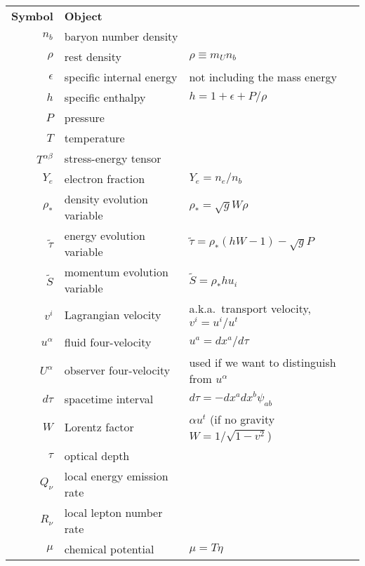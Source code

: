 \begin{table}
  \centering
  \begin{tabular}{rll}
    \textbf{Symbol}       & \textbf{Object}           & \\%
    $n_b$                 & baryon number density     & \\
    $\rho$                & rest density              & $\rho \equiv m_U n_b $ \\
    $\epsilon$            & specific internal energy  & not including the mass energy \\
    $h$                   & specific enthalpy         & $h=1+\epsilon+P/\rho$\\
    $P$                   & pressure                  & \\
    $T$                   & temperature               & \\
    $T^{\alpha \beta}$    & stress-energy tensor      & \\
    $Y_e$                 & electron fraction         & $Y_e=n_e/n_b$\\
    $\rho_*$              & density evolution variable& $\rho_*=\sqrt{g}W\rho$ \\
    $\tilde\tau$          & energy evolution variable & $\tilde\tau=\rho_*(hW-1)-\sqrt{g}P$ \\
    $\tilde S$            & momentum evolution variable & $\tilde S=\rho_*hu_i$\\
    $v^i$                 & Lagrangian velocity       & a.k.a.\ transport velocity, $v^i=u^i/u^t$ \\
    $u^\alpha$            & fluid four-velocity       & $u^a=dx^a/d\tau$ \\
    $U^\alpha$            & observer four-velocity    & used if we want to distinguish from $u^\alpha$ \\
    $d\tau$               & spacetime interval        & $d\tau=-dx^a dx^b \psi_{ab}$ \\
    $W$                   & Lorentz factor            & $\alpha u^t$ (if no gravity $W=1/\sqrt{1-v^2}$) \\
    $\tau$                & optical depth             & \\
    $Q_\nu$               & local energy emission rate& \\
    $R_\nu$               & local lepton number rate  & \\
    $\mu$                 & chemical potential        & $\mu=T\eta$ \\

\end{tabular}
\end{table}
